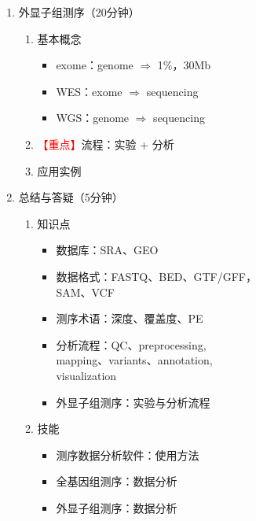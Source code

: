 \documentclass{TIJMUjiaoanLL}
\begin{document}
\begin{enumerate}
\otherTail
\newpage
\otherHeader

  \item 外显子组测序（20分钟）
    \begin{enumerate}
      \item 基本概念
        \begin{itemize}
          \item exome：genome $\Rightarrow$ 1\%，30Mb
          \item WES：exome $\Rightarrow$ sequencing
          \item WGS：genome $\Rightarrow$ sequencing
        \end{itemize}
      \item \textcolor{red}{【重点】}流程：实验 + 分析
      \item 应用实例
    \end{enumerate}

  \item 总结与答疑（5分钟）
    \begin{enumerate}
      \item 知识点
	\begin{itemize}
	  \item 数据库：SRA、GEO
    \item 数据格式：FASTQ、BED、GTF/GFF，\\ SAM、VCF
	  \item 测序术语：深度、覆盖度、PE
    \item 分析流程：QC、preprocessing, \\ mapping、variants、annotation, \\ visualization
	  \item 外显子组测序：实验与分析流程
	\end{itemize}
      \item 技能
	\begin{itemize}
    \item 测序数据分析软件：使用方法
	  \item 全基因组测序：数据分析
	  \item 外显子组测序：数据分析
	\end{itemize}
    \end{enumerate}
\end{enumerate}

\otherTail
\end{document}

